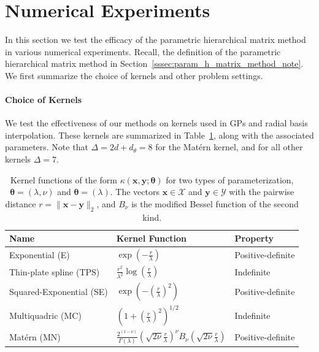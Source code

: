 \documentclass[final,3p,times]{elsarticle}
\renewcommand{\vec}[1]{\boldsymbol{#1}}
\begin{document}
\section{Numerical Experiments}\label{sec:num_experiments}
In this section we test the efficacy of the parametric hierarchical matrix method in various numerical experiments. Recall, the definition of the parametric hierarchical matrix method in Section~\ref{sssec:param_h_matrix_method_note}. We first summarize the choice of kernels and other problem settings.

\paragraph{Choice of Kernels}
 We test the effectiveness of our methods on kernels used in GPs and radial basis interpolation. These kernels are summarized in Table~\ref{tab:kern-table}, along with the associated parameters.  Note that $\Delta = 2d + d_\theta = 8$ for the Mat\'ern kernel, and for all other kernels $\Delta = 7$.
\begin{table}[!ht]
    \centering
    \begin{tabular}{l|l|l}
        \textbf{Name} & \textbf{Kernel Function} & \textbf{Property}\\
        \hline
        Exponential (E) & $\exp\left(-\frac{r}{\lambda}\right)$ & Positive-definite \\ 
        Thin-plate spline (TPS) & $\frac{r^2}{\lambda^2} \log\left(\frac{r}{\lambda}\right)$ & Indefinite \\
        Squared-Exponential (SE) & $\exp\left(-\left(\frac{r}{\lambda}\right)^2\right)$ & Positive-definite \\
        Multiquadric (MC) & $\left(1 + \left(\frac{r}{\lambda}\right)^2\right)^{1/2}$ & Indefinite \\
        Mat\'ern (MN) & $\frac{2^{ (1-\nu)}}{\Gamma(\lambda)}\left(\sqrt{2\nu}\frac{r}{\lambda}\right)^{\nu} B_{\nu}\left(\sqrt{2\nu}\frac{r}{\lambda}\right)$  & Positive-definite
    \end{tabular}
    \caption{Kernel functions of the form  $\kappa(\vec{x},\vec{y}; \vec \theta )$  for two  types of parameterization, $\vec{\theta} = (\lambda, \nu)$ and $\vec{\theta} = (\lambda)$. The vectors $\vec{x} \in \mathcal{X}$ and $\vec{y} \in \mathcal{Y}$ with the pairwise distance $r = \| \vec{x} - \vec{y}\|_{2}$, and $B_{\nu}$ is the modified Bessel function of the second kind.}
    \label{tab:kern-table}
\end{table}
\end{document}
